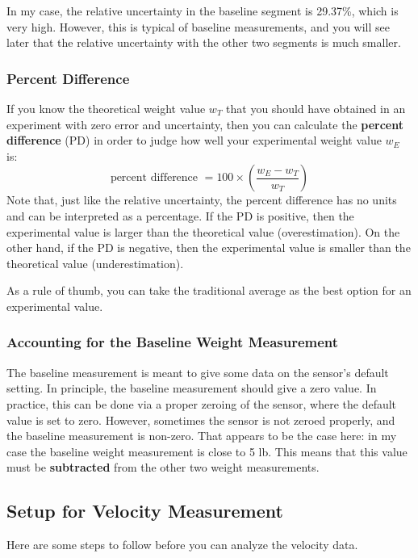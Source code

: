 In my case, the relative uncertainty in the baseline segment is 29.37\%, which is very high. However, this is typical of baseline measurements, and you will see later that the relative uncertainty with the other two segments is much smaller.
\subsubsection{Percent Difference}
If you know the theoretical weight value $w_{T}$ that you should have obtained in an experiment with zero error and uncertainty, then you can calculate the \textbf{percent difference} (PD) in order to judge how well your experimental weight value $w_{E}$ is:
\begin{equation}
    \text{percent difference } = 100 \times \left( \frac{w_{E} - w_{T}}{w_{T}} \right)
\end{equation}
Note that, just like the relative uncertainty, the percent difference has no units and can be interpreted as a percentage. If the PD is positive, then the experimental value is larger than the theoretical value (overestimation). On the other hand, if the PD is negative, then the experimental value is smaller than the theoretical value (underestimation).

As a rule of thumb, you can take the traditional average as the best option for an experimental value.
\subsubsection{Accounting for the Baseline Weight Measurement}
The baseline measurement is meant to give some data on the sensor's default setting. In principle, the baseline measurement should give a zero value. In practice, this can be done via a proper zeroing of the sensor, where the default value is set to zero. However, sometimes the sensor is not zeroed properly, and the baseline measurement is non-zero. That appears to be the case here: in my case the baseline weight measurement is close to 5 lb. This means that this value must be \textbf{subtracted} from the other two weight measurements.
\subsection{Setup for Velocity Measurement}
Here are some steps to follow before you can analyze the velocity data.
